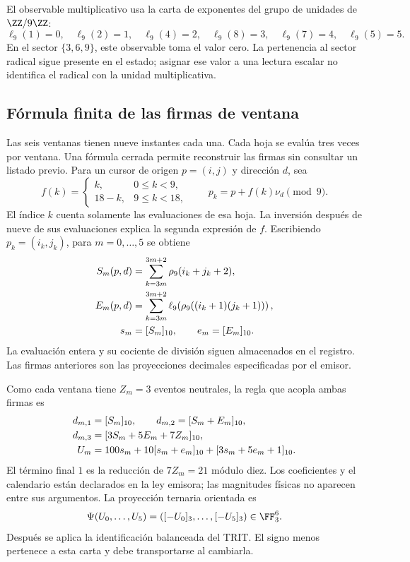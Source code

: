 El observable multiplicativo usa la carta de exponentes del grupo de
unidades de \(\ZZ/9\ZZ\):
\[
 \ell_9(1)=0,\quad\ell_9(2)=1,\quad\ell_9(4)=2,\quad
 \ell_9(8)=3,\quad\ell_9(7)=4,\quad\ell_9(5)=5.
\]
En el sector \(\{3,6,9\}\), este observable toma el valor cero.
La pertenencia al sector radical sigue presente en el estado; asignar
ese valor a una lectura escalar no identifica el radical con la unidad
multiplicativa.

\subsection{Fórmula finita de las firmas de ventana}

Las seis ventanas tienen nueve instantes cada una. Cada hoja se evalúa
tres veces por ventana. Una fórmula cerrada permite reconstruir las
firmas sin consultar un listado previo. Para un cursor de origen
\(p=(i,j)\) y dirección \(d\), sea
\[
 f(k)=\begin{cases}k,&0\le k<9,\\18-k,&9\le k<18,
 \end{cases}\qquad p_k=p+f(k)\nu_d\pmod9.
\]
El índice \(k\) cuenta solamente las evaluaciones de esa hoja. La
inversión después de nueve de sus evaluaciones explica la segunda
expresión de \(f\). Escribiendo \(p_k=(i_k,j_k)\), para
\(m=0,\ldots,5\) se obtiene
\begin{align}
 S_m(p,d)&=\sum_{k=3m}^{3m+2}\rho_9(i_k+j_k+2),\notag\\
 E_m(p,d)&=\sum_{k=3m}^{3m+2}
       \ell_9\!\left(\rho_9((i_k+1)(j_k+1))\right),\notag\\
 s_m&=[S_m]_{10},\qquad e_m=[E_m]_{10}.
 \label{vi:vi:reg:firmas}
\end{align}
La evaluación entera y su cociente de división siguen almacenados en
el registro. Las firmas anteriores son las proyecciones decimales
especificadas por el emisor.

Como cada ventana tiene \(Z_m=3\) eventos neutrales, la regla que
acopla ambas firmas es
\begin{align}
 d_{m,1}&=[S_m]_{10},\qquad
 d_{m,2}=[S_m+E_m]_{10},\notag\\
 d_{m,3}&=[3S_m+5E_m+7Z_m]_{10},\notag\\
 U_m&=100s_m+10[s_m+e_m]_{10}+[3s_m+5e_m+1]_{10}.
 \label{vi:eq:emisor-seis}
\end{align}
El término final \(1\) es la reducción de \(7Z_m=21\) módulo
diez. Los coeficientes y el calendario están declarados en la ley
emisora; las magnitudes físicas no aparecen entre sus argumentos.
La proyección ternaria orientada es
\begin{equation}
 \Psi(U_0,\ldots,U_5)=([-U_0]_3,\ldots,[-U_5]_3)
 \in\FF_3^6.
 \label{vi:eq:psi-catalogo}
\end{equation}
Después se aplica la identificación balanceada del TRIT. El signo
menos pertenece a esta carta y debe transportarse al cambiarla.

